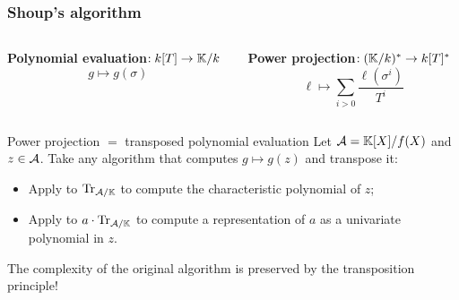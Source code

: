 \documentclass[10pt]{beamer}
\begin{document}

\begin{frame}
  \frametitle{Shoup's algorithm \parencite{shoup95,shoup99}}

  \begin{columns}
    \begin{column}{0.5\textwidth}
      \begin{center}
        \textbf{Polynomial evaluation}$:k[T]\rightarrow\mathbb{K}/k$
        \[g\mapsto g(\sigma)\]
      \end{center}
    \end{column}
    \begin{column}{0.5\textwidth}
      \begin{center}
        \textbf{Power projection}$:(\mathbb{K}/k)^\ast\rightarrow k[T]^\ast$
        \[\ell \mapsto \sum_{i>0} \frac{\ell(\sigma^i)}{T^i}\]
      \end{center}
    \end{column}
  \end{columns}

  \begin{block}{Power projection $=$ transposed polynomial evaluation}
    Let $\mathcal{A}=\mathbb{K}[X]/f(X)$ and $z\in\mathcal{A}$.  Take any
    algorithm that computes $g\mapsto g(z)$ and transpose it:
    \begin{itemize}
    \item Apply to $\operatorname{Tr}_{\mathcal{A}/\mathbb{K}}$ to compute the characteristic
      polynomial of $z$;
    \item Apply to $a\cdot\operatorname{Tr}_{\mathcal{A}/\mathbb{K}}$ to compute a
      representation of $a$ as a univariate polynomial in $z$.
    \end{itemize}
    The complexity of the original algorithm is preserved by the
    transposition principle!
  \end{block}

\end{frame}

\end{document}
